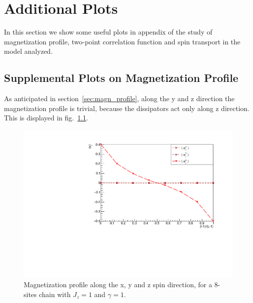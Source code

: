 \chapter{Additional Plots}
\label{appendix_supplemental}

In this section we show some useful plots in appendix of the study of magnetization profile, two-point correlation function and spin transport in the model analyzed.

\section{Supplemental Plots on Magnetization Profile}

As anticipated in section~\ref{sec:magn_profile}, along the y and z direction the magnetization profile is trivial, because the dissipators act only along z direction. This is displayed in fig.~\ref{fig:comparisonSigmaXYZ}.

\begin{figure}[H]
    \centering
    \captionsetup{width=1.\linewidth}
    \includegraphics[scale=0.6]{Figures/comparisonSigmaXYZ.pdf}
    \caption{Magnetization profile along the x, y and z spin direction, for a 8-sites chain with $J_z = 1$ and $\gamma = 1$.}
    \label{fig:comparisonSigmaXYZ}
\end{figure}

